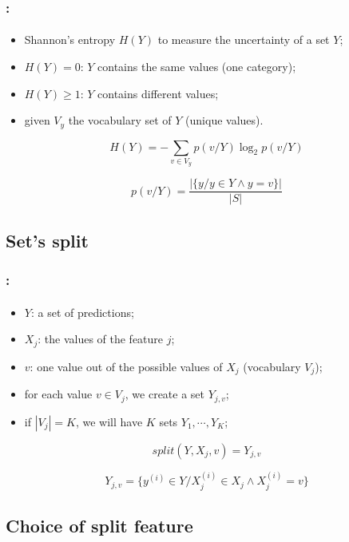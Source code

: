 \documentclass[xcolor=table]{beamer}
\begin{document}
\begin{frame}
	\frametitle{\insertshortsubtitle: \insertsection}
	\framesubtitle{\insertsubsection}
	
	\begin{itemize}
		\item Shannon's entropy $H(Y)$ to measure the uncertainty of a set $Y$;
		\item $H(Y)=0$: $Y$ contains the same values (one category);
		\item $H(Y)\ge 1$: $Y$ contains different values;
		\item given $V_y$ the vocabulary set of $Y$ (unique values).
	\end{itemize}

	\[H(Y) = - \sum\limits_{v \in V_y} p(v/Y) \log_2 p(v/Y)\]
	
	\[p(v/Y) = \frac{|\{y / y \in Y \wedge y = v\}|}{|S|}\]
	
\end{frame}

\subsection{Set's split}

\begin{frame}
	\frametitle{\insertshortsubtitle: \insertsection}
	\framesubtitle{\insertsubsection}
	
	\begin{itemize}
		\item $Y$: a set of predictions;
		\item $X_j$: the values of the feature $j$;
		\item $v$: one value out of the possible values of $X_j$ (vocabulary $V_j$);
		\item for each value $v \in V_j$, we create a set $Y_{j, v}$;
		\item if $|V_j| = K$, we will have $K$ sets $Y_1, \cdots, Y_K$;
	\end{itemize}

	\[split(Y, X_j, v) = Y_{j,v}\]
	
	\[Y_{j,v} = \{y^{(i)} \in Y / X_j^{(i)} \in X_j \wedge X_j^{(i)} = v\}\]

	
\end{frame}

\subsection{Choice of split feature}
\end{document}

